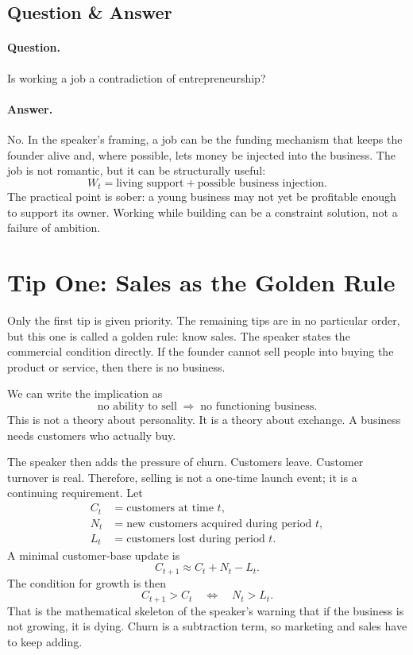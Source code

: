 \subsection{Question \& Answer}

\paragraph{Question.}
Is working a job a contradiction of entrepreneurship?

\paragraph{Answer.}
No. In the speaker's framing, a job can be the funding mechanism that keeps the founder alive and, where possible, lets money be injected into the business. The job is not romantic, but it can be structurally useful:
\[
W_t
=
\text{living support}
+
\text{possible business injection}.
\]
The practical point is sober: a young business may not yet be profitable enough to support its owner. Working while building can be a constraint solution, not a failure of ambition.

\section{Tip One: Sales as the Golden Rule}

Only the first tip is given priority. The remaining tips are in no particular order, but this one is called a golden rule: know sales. The speaker states the commercial condition directly. If the founder cannot sell people into buying the product or service, then there is no business.

We can write the implication as
\[
\text{no ability to sell}
\;\Longrightarrow\;
\text{no functioning business}.
\]
This is not a theory about personality. It is a theory about exchange. A business needs customers who actually buy.

The speaker then adds the pressure of churn. Customers leave. Customer turnover is real. Therefore, selling is not a one-time launch event; it is a continuing requirement. Let
\[
\begin{aligned}
C_t &= \text{customers at time } t, \\
N_t &= \text{new customers acquired during period } t, \\
L_t &= \text{customers lost during period } t.
\end{aligned}
\]
A minimal customer-base update is
\[
C_{t+1}\approx C_t+N_t-L_t.
\]
The condition for growth is then
\[
C_{t+1}>C_t
\quad\Longleftrightarrow\quad
N_t>L_t.
\]
That is the mathematical skeleton of the speaker's warning that if the business is not growing, it is dying. Churn is a subtraction term, so marketing and sales have to keep adding.

